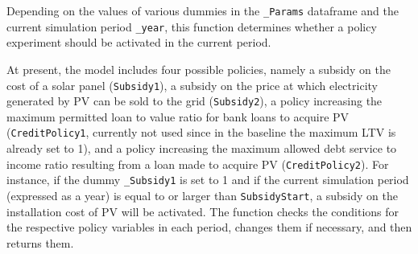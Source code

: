 \documentclass[
  letterpaper,
  DIV=11,
  numbers=noendperiod]{scrartcl}
\begin{document}
Depending on the values of various dummies in the \texttt{\_Params}
dataframe and the current simulation period \texttt{\_year}, this
function determines whether a policy experiment should be activated in
the current period.

At present, the model includes four possible policies, namely a subsidy
on the cost of a solar panel (\texttt{Subsidy1}), a subsidy on the price
at which electricity generated by PV can be sold to the grid
(\texttt{Subsidy2}), a policy increasing the maximum permitted loan to
value ratio for bank loans to acquire PV (\texttt{CreditPolicy1},
currently not used since in the baseline the maximum LTV is already set
to 1), and a policy increasing the maximum allowed debt service to
income ratio resulting from a loan made to acquire PV
(\texttt{CreditPolicy2}). For instance, if the dummy \texttt{\_Subsidy1}
is set to 1 and if the current simulation period (expressed as a year)
is equal to or larger than \texttt{SubsidyStart}, a subsidy on the
installation cost of PV will be activated. The function checks the
conditions for the respective policy variables in each period, changes
them if necessary, and then returns them.
\end{document}
